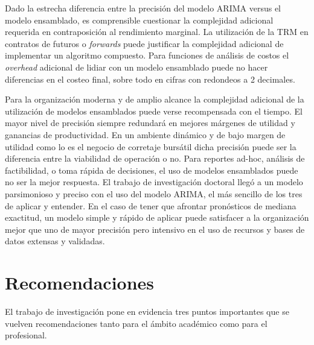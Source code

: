 Dado la estrecha diferencia entre la precisión del modelo ARIMA versus el modelo ensamblado, es comprensible cuestionar la complejidad adicional requerida en contraposición al rendimiento marginal. La utilización de la TRM en contratos de futuros o \emph{forwards} puede justificar la complejidad adicional de implementar un algoritmo compuesto. Para funciones de análisis de costos el \emph{overhead} adicional de lidiar con un modelo ensamblado puede no hacer diferencias en el costeo final, sobre todo en cifras con redondeos a 2 decimales. 

Para la organización moderna y de amplio alcance la complejidad adicional de la utilización de modelos ensamblados puede verse recompensada con el tiempo. El mayor nivel de precisión siempre redundará en mejores márgenes de utilidad y ganancias de productividad. En un ambiente dinámico y de bajo margen de utilidad como lo es el negocio de corretaje bursátil dicha precisión puede ser la diferencia entre la viabilidad de operación o no. Para reportes ad-hoc, análisis de factibilidad, o toma rápida de decisiones, el uso de modelos ensamblados puede no ser la mejor respuesta. El trabajo de investigación doctoral llegó a un modelo parsimonioso y preciso con el uso del modelo ARIMA, el más sencillo de los tres de aplicar y entender. En el caso de tener que afrontar pronósticos de mediana exactitud, un modelo simple y rápido de aplicar puede satisfacer a la organización mejor que uno de mayor precisión pero intensivo en el uso de recursos y bases de datos extensas y validadas.  

\section{Recomendaciones}
El trabajo de investigación pone en evidencia tres puntos importantes que se vuelven recomendaciones tanto para el ámbito académico como para el profesional. 

